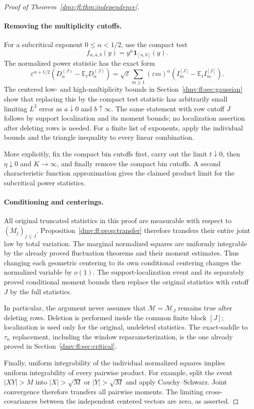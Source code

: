 \documentclass[11pt,letterpaper]{article}
\numberwithin{equation}{section}
\theoremstyle{definition}\newtheorem{definition}[theorem]{Definition}
\theoremstyle{remark}\newtheorem{remark}[theorem]{Remark}
\newcommand{\E}{\mathbb E}
\newcommand{\eps}{\varepsilon}
\newcommand{\ind}{\mathbf 1}
\begin{document}
\begin{proof}[Proof of Theorem~\ref{dmv:fl:thm:independence}]
\paragraph{Removing the multiplicity cutoffs.}
For a subcritical exponent $0\le\alpha<1/2$, use the compact
test
\[
           f_{\alpha,a,b}(y)=y^\alpha\ind_{[a,b]}(y).
\]
The normalized power statistic has the exact form
\[
 \eps^{\alpha+1/2}(D_\alpha^{(J)}-\E_tD_\alpha^{(J)})
 =
 \sqrt\eps\sum_{m\ge1}
        (\eps m)^\alpha(I_m^{[J]}-\E_tI_m^{[J]}).
\]
The centered low- and high-multiplicity bounds in
Section~\ref{dmv:fl:sec:gaussian} show that replacing this by the compact
test statistic has arbitrarily small limiting $L^2$ error as
$a\downarrow0$ and $b\uparrow\infty$. The same statement with
row cutoff $J$ follows by support localization and its moment
bounds; no localization assertion after deleting rows is needed.
For a finite list of exponents, apply the individual bounds and
the triangle inequality to every linear combination.

More explicitly, fix the compact bin cutoffs first, carry out the
limit $t\downarrow0$, then $\eta\downarrow0$ and $K\to\infty$,
and finally remove the compact bin cutoffs. A second characteristic
function approximation gives the claimed product limit for the
subcritical power statistics.

\paragraph{Conditioning and centerings.}
All original truncated statistics in this proof are measurable
with respect to $(M_j)_{j\le J}$. Proposition~\ref{dmv:fl:prop:transfer}
therefore transfers their entire joint law by total variation.
The marginal normalized squares are uniformly integrable by the
already proved fluctuation theorems and their moment estimates.
Thus changing each geometric centering to its own conditional
centering changes the normalized variable by $o(1)$.
The support-localization event and its separately proved
conditional moment bounds then replace the original statistics
with cutoff $J$ by the full statistics.

In particular, the argument never assumes that
$\mathcal M=\mathcal M_J$ remains true after deleting rows.
Deletion is performed inside the common finite block $[J]$;
localization is used only for the original, undeleted statistics.
The exact-saddle to $\tau_n$ replacement, including the window
reparameterization, is the one already proved in
Section~\ref{dmv:fl:sec:critical}.

Finally, uniform integrability of the individual normalized
squares implies uniform integrability of every pairwise product.
For example, split the event $|XY|>M$ into $|X|>\sqrt M$ or
$|Y|>\sqrt M$ and apply Cauchy--Schwarz.
Joint convergence therefore transfers all pairwise moments.
The limiting cross-covariances between the independent centered
vectors are zero, as asserted.
\end{proof}
\end{document}
